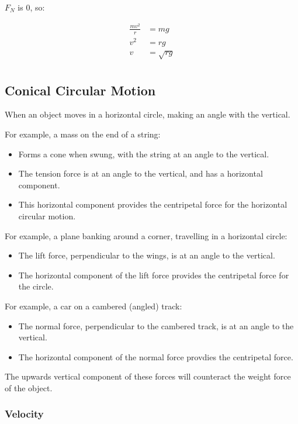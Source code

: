 \documentclass[a4paper,11pt]{report}
\begin{document}
$F_N$ is 0, so:

$$
\begin{aligned}
\frac{mv^2}{r} & = mg \\
v^2 & = rg \\
v & = \sqrt{rg} \\
\end{aligned}
$$

\subsection{Conical Circular Motion}

When an object moves in a horizontal circle, making an angle with the vertical.

For example, a mass on the end of a string:

\begin{itemize}
\item Forms a cone when swung, with the string at an angle to the vertical.
\item The tension force is at an angle to the vertical, and has a horizontal
	component.
\item This horizontal component provides the centripetal force for the
	horizontal circular motion.
\end{itemize}

For example, a plane banking around a corner, travelling in a horizontal circle:

\begin{itemize}
\item The lift force, perpendicular to the wings, is at an angle to the
	vertical.
\item The horizontal component of the lift force provides the centripetal force
	for the circle.
\end{itemize}

For example, a car on a cambered (angled) track:

\begin{itemize}
\item The normal force, perpendicular to the cambered track, is at an angle to
	the vertical.
\item The horizontal component of the normal force provdies the centripetal
	force.
\end{itemize}

The upwards vertical component of these forces will counteract the weight force
of the object.

\subsubsection{Velocity}
\end{document}
